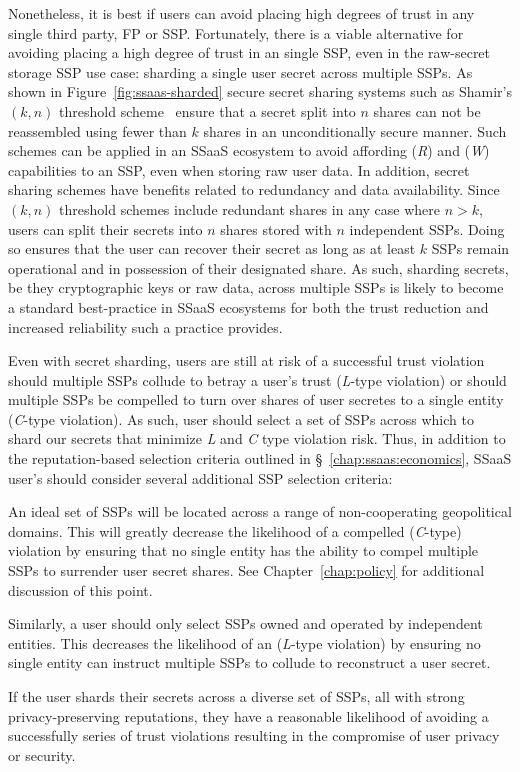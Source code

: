 Nonetheless, it is best if users can avoid placing high degrees of
trust in any single third party, FP or SSP. Fortunately, there is a
viable alternative for avoiding placing a high degree of trust in an
single SSP, even in the raw-secret storage SSP use case: sharding a
single user secret across multiple SSPs. As shown in
Figure~\ref{fig:ssaas-sharded} secure secret sharing systems such as
Shamir's $(k, n)$ threshold scheme~\cite{shamir1979} ensure that a
secret split into $n$ shares can not be reassembled using fewer than
$k$ shares in an unconditionally secure manner. Such schemes can be
applied in an SSaaS ecosystem to avoid affording (\emph{R}) and
(\emph{W}) capabilities to an SSP, even when storing raw user data. In
addition, secret sharing schemes have benefits related to redundancy
and data availability. Since $(k, n)$ threshold schemes include
redundant shares in any case where $n > k$, users can split their
secrets into $n$ shares stored with $n$ independent SSPs. Doing so
ensures that the user can recover their secret as long as at least $k$
SSPs remain operational and in possession of their designated
share. As such, sharding secrets, be they cryptographic keys or raw
data, across multiple SSPs is likely to become a standard
best-practice in SSaaS ecosystems for both the trust reduction and
increased reliability such a practice provides.

Even with secret sharding, users are still at risk of a successful
trust violation should multiple SSPs collude to betray a user's trust
(\emph{L}-type violation) or should multiple SSPs be compelled to turn
over shares of user secretes to a single entity (\emph{C}-type
violation). As such, user should select a set of SSPs across which to
shard our secrets that minimize \emph{L} and \emph{C} type violation
risk. Thus, in addition to the reputation-based selection criteria
outlined in \S~\ref{chap:ssaas:economics}, SSaaS user's should
consider several additional SSP selection criteria:

\begin{packed_desc}
\item[Geopolitical Diversity:] An ideal set of SSPs will be located
  across a range of non-cooperating geopolitical domains. This will
  greatly decrease the likelihood of a compelled (\emph{C}-type)
  violation by ensuring that no single entity has the ability to
  compel multiple SSPs to surrender user secret shares. See
  Chapter~\ref{chap:policy} for additional discussion of this point.
\item[Ownership Diversity:] Similarly, a user should only select SSPs
  owned and operated by independent entities. This decreases the
  likelihood of an (\emph{L}-type violation) by ensuring no single
  entity can instruct multiple SSPs to collude to reconstruct a user
  secret.
\end{packed_desc}

If the user shards their secrets across a diverse set of SSPs, all
with strong privacy-preserving reputations, they have a reasonable
likelihood of avoiding a successfully series of trust violations
resulting in the compromise of user privacy or security.

